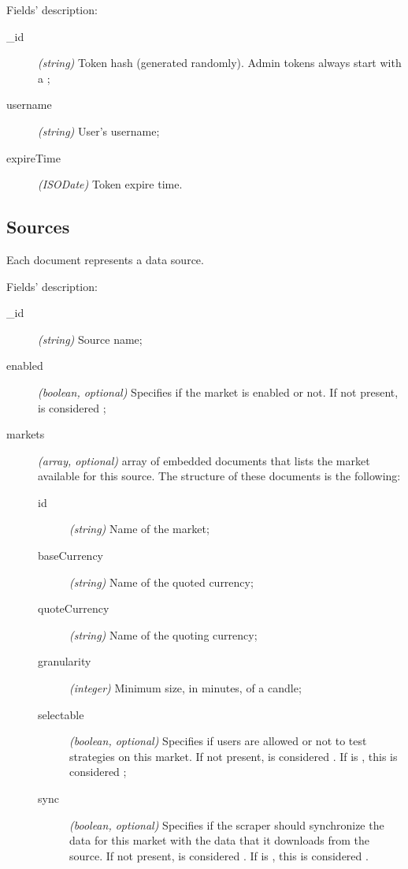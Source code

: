 Fields' description:
\begin{description}
	\item[\_id] \textit{(string)} Token hash (generated randomly). Admin
		tokens always start with a ;
	\item[username] \textit{(string)} User's username;
	\item[expireTime] \textit{(ISODate)} Token expire time.
\end{description}

\subsection{Sources}

Each document represents a data source.



Fields' description:
\begin{description}
	\item[\_id] \textit{(string)} Source name;
	\item[enabled] \textit{(boolean, optional)} Specifies if the market is
		enabled or not. If not present, is considered ;
	\item[markets] \textit{(array, optional)} array of embedded documents
		that lists the market available for this source. The structure
		of these documents is the following:
		\begin{description}
			\item[id] \textit{(string)} Name of the market;
			\item[baseCurrency] \textit{(string)} Name of the quoted
				currency;
			\item[quoteCurrency] \textit{(string)} Name of the
				quoting currency;
			\item[granularity] \textit{(integer)} Minimum size,
				in minutes, of a candle;
			\item[selectable] \textit{(boolean, optional)} Specifies
				if users are allowed or not to test strategies
				on this market. If not present, is considered
				. If  is ,
				this is considered ;
			\item[sync] \textit{(boolean, optional)} Specifies if
				the scraper should synchronize the data for this
				market with the data that it downloads from the
				source. If not present, is considered
				. If  is ,
				this is considered .
		\end{description}
\end{description}

